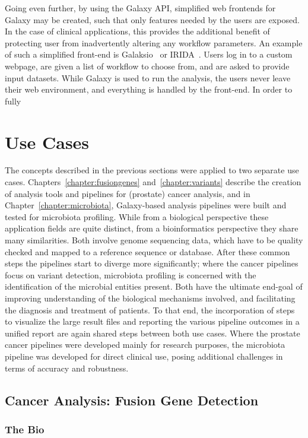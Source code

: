 Going even further, by using the Galaxy API, simplified web frontends for Galaxy may be created, such that only features needed by the users are exposed. In the case of clinical applications, this provides the additional benefit of protecting user from inadvertently altering any workflow parameters. An example of such a simplified front-end is Galaksio~\cite{galaksio} or IRIDA~\cite{TODO}. Users log in to a custom webpage, are given a list of workflow to choose from, and are asked to provide input datasets. While Galaxy is used to run the analysis, the users never leave their web environment, and everything is handled by the front-end. In order to fully


\section{Use Cases}

The concepts described in the previous sections were applied to two separate use cases. Chapters~\ref{chapter:fusiongenes} and~\ref{chapter:variants} describe the creation of analysis tools and pipelines for (prostate) cancer analysis, and in Chapter~\ref{chapter:microbiota}, Galaxy-based analysis pipelines were built and tested for microbiota profiling. While from a biological perspective these application fields are quite distinct, from a bioinformatics perspective they share many similarities. Both involve genome sequencing data, which have to be quality checked and mapped to a reference sequence or database. After these common steps the pipelines start to diverge more significantly; where the cancer pipelines focus on variant detection, microbiota profiling is concerned with the identification of the microbial entities present. Both have the ultimate end-goal of improving understanding of the biological mechanisms involved, and facilitating the diagnosis and treatment of patients. To that end, the incorporation of steps to visualize the large result files and reporting the various pipeline outcomes in a unified report are again shared steps between both use cases. Where the prostate cancer pipelines were developed mainly for research purposes, the microbiota pipeline was developed for direct clinical use, posing additional challenges in terms of accuracy and robustness.


\subsection{Cancer Analysis: Fusion Gene Detection}
\subsubsection{The Bio}

